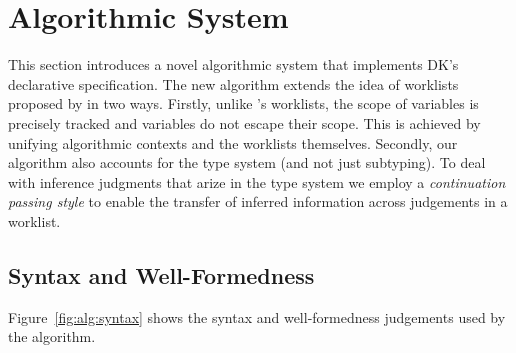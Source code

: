 \section{Algorithmic System}

This section introduces a novel algorithmic system that implements 
DK's declarative specification. The new algorithm extends the idea
of worklists proposed by \citet{itp2018} in two ways. Firstly,
unlike \citet{itp2018}'s worklists, the scope of variables is precisely tracked
and variables do not escape their scope. This is achieved by unifying algorithmic contexts and the worklists themselves.
Secondly, our algorithm also
accounts for the type system (and not just subtyping). To deal with
inference judgments that arize in the type system we employ a \emph{continuation
passing style} to enable the transfer of inferred information across
judgements in a worklist.

\subsection{Syntax and Well-Formedness}

Figure~\ref{fig:alg:syntax} shows the syntax and well-formedness judgements used by the algorithm.

